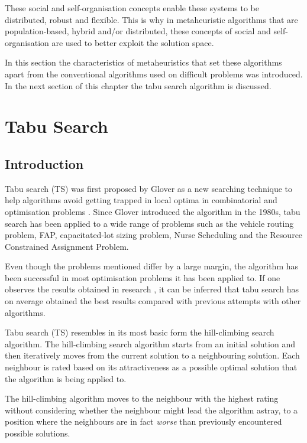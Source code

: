These social and self-organisation concepts enable these systems to be distributed, robust and flexible. This is why in metaheuristic algorithms that are population-based, hybrid and/or distributed, these concepts of social and self-organisation  are used to better exploit the solution space\cite{Self-AdaptiveMeta}.

In this section the characteristics of metaheuristics that set these algorithms apart from the conventional algorithms used on difficult problems was introduced. In the next section of this chapter the tabu search algorithm is discussed.
\section{Tabu Search}
\label{sec:tabusearch}
\subsection{Introduction}
\label{sec:TSIntroduction}
Tabu search (TS) was first proposed by Glover\cite{Glover89} as a new searching technique to help algorithms avoid getting trapped in local optima in combinatorial and optimisation problems \cite{TabuRCAProblem}. Since Glover introduced the algorithm in the 1980s, tabu search has been applied to a wide range of problems such as the vehicle routing problem\cite{TabuVechicleRoutingWithTimeWindows}, FAP\cite{TabuMontemanniSmith}, capacitated-lot sizing problem\cite{TabuCarryOver}, Nurse Scheduling\cite{TabuNurse} and the Resource Constrained Assignment Problem\cite{TabuRCAProblem}. 

Even though the problems mentioned differ by a large margin, the algorithm has been successful in most optimisation problems it has been applied to. If one observes the results obtained in research \cite{TabuMontemanniSmith,tabuglobalplanning3g}, it can be inferred that tabu search has on average obtained the best results compared with previous attempts with other algorithms. 

Tabu search (TS) resembles in its most basic form the hill-climbing search algorithm\cite{TabuBiddingStrats}. The hill-climbing search algorithm starts from an initial solution and then iteratively moves from the current solution to a neighbouring solution\cite{AIModernApproach}. Each neighbour is rated based on its attractiveness as a possible optimal solution that the algorithm is being applied to\cite{AIModernApproach}. 

The hill-climbing algorithm moves to the neighbour with the highest rating without considering whether the neighbour might lead the algorithm astray, to a position where the neighbours are in fact \emph{worse} than previously encountered possible solutions\cite{AIModernApproach}. 

